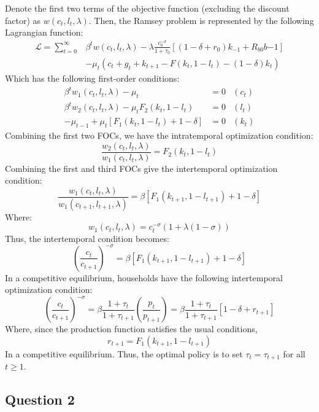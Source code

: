 \documentclass{article}
\renewcommand{\L}{\mathcal{L}}
\begin{document}
Denote the first two terms of the objective function (excluding the discount factor) as $w(c_t,l_t,\lambda)$. Then, the Ramsey problem is represented by the following Lagrangian function:
{ \begin{align*}
	\L = \sum_{t=0}^\infty &\beta^tw(c_t,l_t,\lambda)- \lambda\frac{c_0^{-\sigma}}{1+\tau_0}\left[(1-\delta + r_0)k_{-1} + R_{b0}b{-1}\right] \\
		&- \mu_t\left(c_t + g_t + k_{t+1} - F(k_t,1-l_t) - (1-\delta)k_t\right)
\end{align*} }
Which has the following first-order conditions:
\begin{align*}
	\beta^tw_1(c_t,l_t,\lambda) - \mu_t					&= 0	&(c_t)		\\
	\beta^tw_2(c_t,l_t,\lambda) - \mu_tF_2(k_t,1-l_t)	&= 0	&(l_t)		\\
	-\mu_{t-1} + \mu_t[F_1(k_t,1-l_t)+1-\delta]			&= 0	&(k_t)	
\end{align*}
Combining the first two FOCs, we have the intratemporal optimization condition:
\[
	\frac{w_2(c_t,l_t,\lambda)}{w_1(c_t,l_t,\lambda)} = F_2(k_t,1-l_t)
\]
Combining the first and third FOCs give the intertemporal optimization condition:
\[
	\frac{w_1(c_t,l_t,\lambda)}{w_1(c_{t+1},l_{t+1},\lambda)} = \beta\left[F_1(k_{t+1},1-l_{t+1})+1-\delta\right]
\]
Where:
\[
	w_1(c_t,l_t,\lambda) = c_t^{-\sigma}\left(1 + \lambda(1-\sigma)\right)
\]
Thus, the intertemporal condition becomes:
\[
	\left(\frac{c_t}{c_{t+1}}\right)^{-\sigma} = \beta\left[F_1(k_{t+1},1-l_{t+1})+1-\delta\right]
\]
In a competitive equilibrium, households have the following intertemporal optimization condition:
\[
	\left(\frac{c_t}{c_{t+1}}\right)^{-\sigma} = \beta\frac{1 + \tau_t}{1+\tau_{t+1}}\left(\frac{p_t}{p_{t+1}}\right) 
		= \beta\frac{1 + \tau_t}{1+\tau_{t+1}}[1-\delta+r_{t+1}]
\]
Where, since the production function satisfies the usual conditions, $${r_{t+1} = F_1(k_{t+1},1-l_{t+1})}$$ In a competitive equilibrium. Thus, the optimal policy is to set ${\tau_t = \tau_{t+1}}$ for all ${t\geq 1}$. 



\pagebreak
\subsection*{Question 2}
\end{document}
